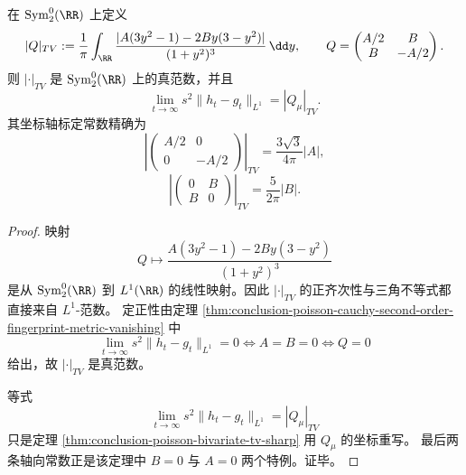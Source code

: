 \begin{theorem}\label{thm:conclusion-poisson-cauchy-tv-second-order-norm}
在 \(\mathrm{Sym}_2^0(\RR)\) 上定义
\[
|Q|_{TV}
:=
\frac{1}{\pi}
\int_{\RR}
\frac{|A(3y^2-1)-2By(3-y^2)|}{(1+y^2)^3}\,\dd y,
\qquad
Q=
\begin{pmatrix}
A/2 & B\\
B & -A/2
\end{pmatrix}.
\]
则 \(|\cdot|_{TV}\) 是 \(\mathrm{Sym}_2^0(\RR)\) 上的真范数，并且
\[
\lim_{t\to\infty}s^2\|h_t-g_t\|_{L^1}=|Q_\mu|_{TV}.
\]
其坐标轴标定常数精确为
\[
\left|
\begin{pmatrix}
A/2&0\\[1mm]0&-A/2
\end{pmatrix}
\right|_{TV}
=
\frac{3\sqrt3}{4\pi}|A|,
\]
\[
\left|
\begin{pmatrix}
0&B\\[1mm]B&0
\end{pmatrix}
\right|_{TV}
=
\frac{5}{2\pi}|B|.
\]
\end{theorem}

\begin{proof}
映射
\[
Q\longmapsto
\frac{A(3y^2-1)-2By(3-y^2)}{(1+y^2)^3}
\]
是从 \(\mathrm{Sym}_2^0(\RR)\) 到 \(L^1(\RR)\) 的线性映射。因此 \(|\cdot|_{TV}\) 的正齐次性与三角不等式都直接来自 \(L^1\)-范数。
定正性由定理 \ref{thm:conclusion-poisson-cauchy-second-order-fingerprint-metric-vanishing} 中
\[
\lim_{t\to\infty}s^2\|h_t-g_t\|_{L^1}=0
\iff
A=B=0
\iff
Q=0
\]
给出，故 \(|\cdot|_{TV}\) 是真范数。

等式
\[
\lim_{t\to\infty}s^2\|h_t-g_t\|_{L^1}=|Q_\mu|_{TV}
\]
只是定理 \ref{thm:conclusion-poisson-bivariate-tv-sharp} 用 \(Q_\mu\) 的坐标重写。
最后两条轴向常数正是该定理中 \(B=0\) 与 \(A=0\) 两个特例。证毕。
\end{proof}
